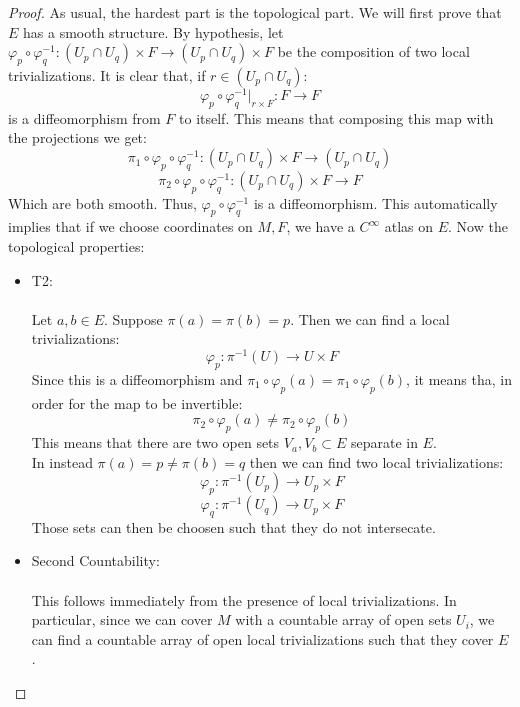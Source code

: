 \documentclass[12pt,a4paper]{report}
\theoremstyle{definition}
\theoremstyle{Theorem}
\theoremstyle{break}
\theoremstyle{definition}
\begin{document}
	\begin{proof}
		As usual, the hardest part is the topological part. We will first prove that $E$ has a smooth structure. By hypothesis, let $\varphi_p\circ \varphi_q^{-1}:(U_p\cap U_q)\times F\rightarrow (U_p\cap U_q)\times F$ be the composition of two local trivializations. It is clear that, if $r\in (U_p\cap U_q)$:
		$$\varphi_p\circ \varphi_q^{-1}\bigg|_{r\times F}:F\longrightarrow F$$
		is a diffeomorphism from $F$ to itself. This means that composing this map with the projections we get:
		$$\pi_1\circ \varphi_p\circ \varphi_q^{-1}:(U_p\cap U_q)\times F\rightarrow (U_p\cap U_q)$$
		$$\pi_2\circ \varphi_p\circ \varphi_q^{-1}:(U_p\cap U_q)\times F\rightarrow F$$
		Which are both smooth. Thus, $\varphi_p\circ \varphi_q^{-1}$ is a diffeomorphism. This automatically implies that if we choose coordinates on $M,F$, we have a $C^\infty$ atlas on $E$. Now the topological properties:
		\begin{itemize}
			\item T2:\\
			\\
			Let $a,b\in E$. Suppose $\pi(a)=\pi(b)=p$. Then we can find a local trivializations:
			$$\varphi_p:\pi^{-1}(U)\rightarrow U\times F$$
			Since this is a diffeomorphism and $\pi_1\circ \varphi_p(a)=\pi_1\circ\varphi_p(b)$, it means tha, in order for the map to be invertible:
			$$\pi_2\circ \varphi_p(a)\neq \pi_2\circ \varphi_p(b)$$
			This means that there are two open sets $V_a,V_b\subset E$ separate in $E$.\\
			In instead $\pi(a)=p\neq \pi(b)=q$ then we can find two local trivializations:
			$$\varphi_p:\pi^{-1}(U_p)\rightarrow U_p\times F$$
			$$\varphi_q:\pi^{-1}(U_q)\rightarrow U_p\times F$$
			Those sets can then be choosen such that they do not intersecate.
			\item Second Countability:\\
			\\
			This follows immediately from the presence of local trivializations. In particular, since we can cover $M$ with a countable array of open sets $U_i$, we can find a countable array of open local trivializations such that they cover $E$.
		\end{itemize}
	\end{proof}
\end{document}
